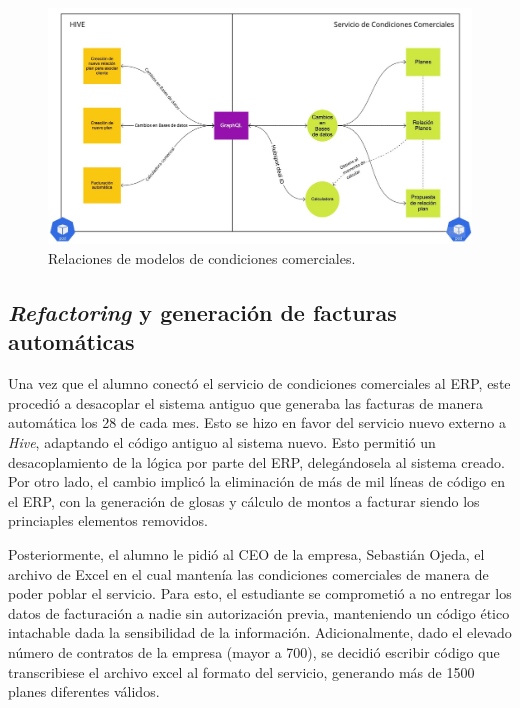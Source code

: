     \begin{figure}
      \centering
      \includegraphics[width=\linewidth]{figures/cc/cc_arquitectura.jpg}
      \caption{Relaciones de modelos de condiciones comerciales.}
      \label{fig:cc_arquitectura}
    \end{figure}
    
  \subsection{\textit{Refactoring} y generación de facturas automáticas}
    \label{refactoring_y_facturas_automaticas}

    Una vez que el alumno conectó el servicio de condiciones comerciales al ERP, este procedió a desacoplar el sistema antiguo que generaba las facturas de manera automática los 28 de cada mes. Esto se hizo en favor del servicio nuevo externo a \textit{Hive}, adaptando el código antiguo al sistema nuevo. Esto permitió un desacoplamiento de la lógica por parte del ERP, delegándosela al sistema creado. Por otro lado, el cambio implicó la eliminación de más de mil líneas de código en el ERP, con la generación de glosas y cálculo de montos a facturar siendo los princiaples elementos removidos.

    Posteriormente, el alumno le pidió al CEO de la empresa, Sebastián Ojeda, el archivo de Excel en el cual mantenía las condiciones comerciales de manera de poder poblar el servicio. Para esto, el estudiante se comprometió a no entregar los datos de facturación a nadie sin autorización previa, manteniendo un código ético intachable dada la sensibilidad de la información. Adicionalmente, dado el elevado número de contratos de la empresa (mayor a 700), se decidió escribir código que transcribiese el archivo excel al formato del servicio, generando más de 1500 planes diferentes válidos.

